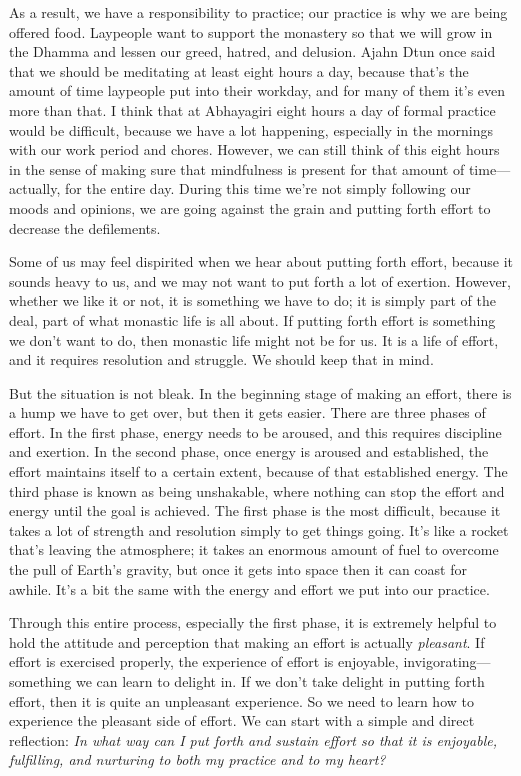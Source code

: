 As a result, we have a responsibility to practice; our practice is why 
we are being offered food. Laypeople want to support the monastery so 
that we will grow in the Dhamma and lessen our greed, hatred, and 
delusion. Ajahn Dtun once said that we should be meditating at least 
eight hours a day, because that's the amount of time laypeople put into 
their workday, and for many of them it's even more than that. I think 
that at Abhayagiri eight hours a day of formal practice would be 
difficult, because we have a lot happening, especially in the mornings 
with our work period and chores. However, we can still think of this 
eight hours in the sense of making sure that mindfulness is present for 
that amount of time---actually, for the entire day. During this time 
we're not simply following our moods and opinions, we are going against 
the grain and putting forth effort to decrease the defilements.

Some of us may feel dispirited when we hear about putting forth effort, 
because it sounds heavy to us, and we may not want to put forth a lot 
of exertion. However, whether we like it or not, it is something we 
have to do; it is simply part of the deal, part of what monastic life 
is all about. If putting forth effort is something we don't want to do, 
then monastic life might not be for us. It is a life of effort, and it 
requires resolution and struggle. We should keep that in mind.

But the situation is not bleak. In the beginning stage of making an 
effort, there is a hump we have to get over, but then it gets easier. 
There are three phases of effort. In the first phase, energy needs to 
be aroused, and this requires discipline and exertion. In the second 
phase, once energy is aroused and established, the effort maintains 
itself to a certain extent, because of that established energy. The 
third phase is known as being unshakable, where nothing can stop the 
effort and energy until the goal is achieved. The first phase is the 
most difficult, because it takes a lot of strength and resolution 
simply to get things going. It's like a rocket that's leaving the 
atmosphere; it takes an enormous amount of fuel to overcome the pull of 
Earth's gravity, but once it gets into space then it can coast for 
awhile. It's a bit the same with the energy and effort we put into our 
practice.

Through this entire process, especially the first phase, it is 
extremely helpful to hold the attitude and perception that making an 
effort is actually \emph{pleasant}. If effort is exercised properly, 
the experience of effort is enjoyable, invigorating---something we can 
learn to delight in. If we don't take delight in putting forth effort, 
then it is quite an unpleasant experience. So we need to learn how to 
experience the pleasant side of effort. We can start with a simple and 
direct reflection: \emph{In what way can I put forth and sustain effort 
so that it is enjoyable, fulfilling, and nurturing to both my practice 
and to my heart?}

